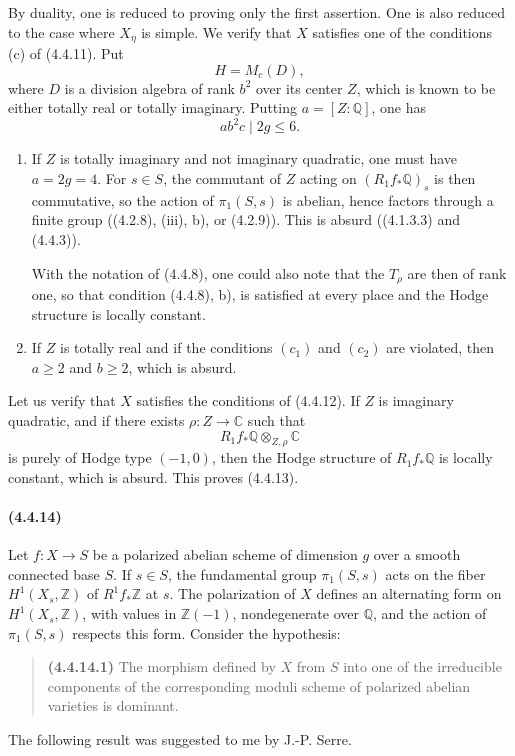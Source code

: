 \documentclass[10pt]{article}
\newcommand{\C}{\mathbb C}
\newcommand{\Q}{\mathbb Q}
\newcommand{\Z}{\mathbb Z}
\begin{document}
By duality, one is reduced to proving only the first assertion. One is also reduced to the case where $X_\eta$ is simple. We verify that $X$ satisfies one of the conditions (c) of (4.4.11). Put
\[
H=M_c(D),
\]
where $D$ is a division algebra of rank $b^2$ over its center $Z$, which is known to be either totally real or totally imaginary. Putting $a=[Z:\Q]$, one has
\[
\tag{4.4.13.1}
ab^2c\mid 2g\le6.
\]

\begin{enumerate}[label=\arabic*)]
\item If $Z$ is totally imaginary and not imaginary quadratic, one must have $a=2g=4$. For $s\in S$, the commutant of $Z$ acting on $(R_1f_*\Q)_s$ is then commutative, so the action of $\pi_1(S,s)$ is abelian, hence factors through a finite group ((4.2.8), (iii), b), or (4.2.9)). This is absurd ((4.1.3.3) and (4.4.3)).

With the notation of (4.4.8), one could also note that the $T_\rho$ are then of rank one, so that condition (4.4.8), b), is satisfied at every place and the Hodge structure is locally constant.

\item If $Z$ is totally real and if the conditions $(c_1)$ and $(c_2)$ are violated, then $a\ge2$ and $b\ge2$, which is absurd.
\end{enumerate}

Let us verify that $X$ satisfies the conditions of (4.4.12). If $Z$ is imaginary quadratic, and if there exists $\rho:Z\to\C$ such that
\[
R_1f_*\Q\otimes_{Z,\rho}\C
\]
is purely of Hodge type $(-1,0)$, then the Hodge structure of $R_1f_*\Q$ is locally constant, which is absurd. This proves (4.4.13).

\paragraph{(4.4.14)} Let $f:X\to S$ be a polarized abelian scheme of dimension $g$ over a smooth connected base $S$. If $s\in S$, the fundamental group $\pi_1(S,s)$ acts on the fiber $H^1(X_s,\Z)$ of $R^1f_*\Z$ at $s$. The polarization of $X$ defines an alternating form on $H^1(X_s,\Z)$, with values in $\Z(-1)$, nondegenerate over $\Q$, and the action of $\pi_1(S,s)$ respects this form. Consider the hypothesis:
\begin{quote}
\noindent\textbf{(4.4.14.1)} The morphism defined by $X$ from $S$ into one of the irreducible components of the corresponding moduli scheme of polarized abelian varieties is dominant.
\end{quote}
The following result was suggested to me by J.-P. Serre.
\end{document}
